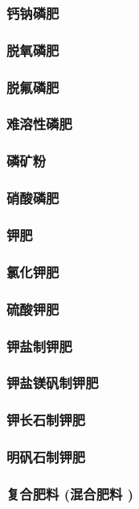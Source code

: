 \documentclass[UTF8]{../../ApplicationUniverse}
\begin{document}
        \subsubsection{钙钠磷肥}
        \subsubsection{脱氧磷肥}
        \subsubsection{脱氟磷肥}
    \subsubsection{难溶性磷肥}
        \subsubsection{磷矿粉}
    \subsubsection{硝酸磷肥}
\subsubsection{钾肥}
    \subsubsection{氯化钾肥}
    \subsubsection{硫酸钾肥}
    \subsubsection{钾盐制钾肥}
    \subsubsection{钾盐镁矾制钾肥}
    \subsubsection{钾长石制钾肥}
    \subsubsection{明矾石制钾肥}
\subsubsection{复合肥料 (混合肥料 )}
\end{document}
